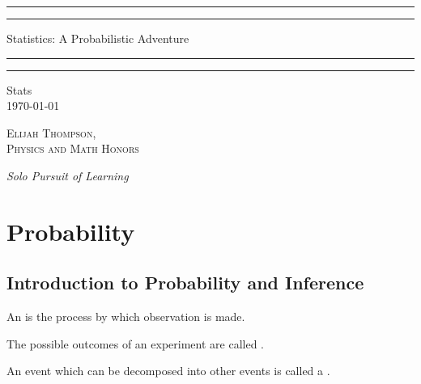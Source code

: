 \documentclass[12pt, a4paper, twoside, openright, titlepage]{book}
\begin{document}

\begin{titlepage}
    \centering
    \scshape
    \vspace*{\baselineskip}
    \rule{\textwidth}{1.6pt}\vspace*{-\baselineskip}\vspace*{2pt}
    \rule{\textwidth}{0.4pt}
    
    \vspace{0.75\baselineskip}
    
    {\LARGE Statistics: A Probabilistic Adventure}
    
    \vspace{0.75\baselineskip}
    
    \rule{\textwidth}{0.4pt}\vspace*{-\baselineskip}\vspace{3.2pt}
    \rule{\textwidth}{1.6pt}
    
    \vspace{2\baselineskip}
    Stats \\
    \vspace*{3\baselineskip}
    \monthdayyeardate\today \\
    \vspace*{5.0\baselineskip}
    
    {\scshape\Large Elijah Thompson, \\ Physics and Math Honors\\}
    
    \vspace{1.0\baselineskip}
    \textit{Solo Pursuit of Learning}
\end{titlepage}

\tableofcontents


\chapter{Probability}

\section{\textsection Introduction to Probability and Inference}

\begin{defn}{}{}
    An  is the process by which observation is made.
\end{defn}

\begin{defn}{}{}
    The possible outcomes of an experiment are called .

    An event which can be decomposed into other events is called a .
\end{defn}
\end{document}
